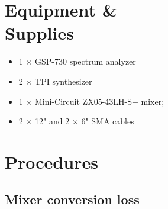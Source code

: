 \documentclass[letterpaper, 11pt]{article}
\begin{document}
\section{Equipment \& \\Supplies}

\begin{itemize}[itemsep=0.5ex]
	\item 1 $\times$ GSP-730 spectrum analyzer
	\item 2 $\times$ TPI synthesizer
	\item 1 $\times$ Mini-Circuit ZX05-43LH-S+ mixer;
	\item 2 $\times$ 12" and 2 $\times$ 6" SMA cables
\end{itemize}

\section{Procedures}

\subsection{Mixer conversion loss}
\label{sec:mixer_cl}
\end{document}
